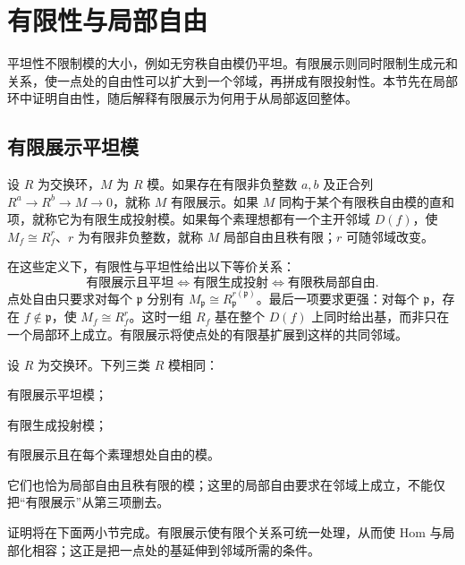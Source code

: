 
\section{有限性与局部自由}\label{b3:sec:1202}

平坦性不限制模的大小，例如无穷秩自由模仍平坦。有限展示则同时限制生成元和关系，使一点处的自由性可以扩大到一个邻域，再拼成有限投射性。本节先在局部环中证明自由性，随后解释有限展示为何用于从局部返回整体。

\subsection{有限展示平坦模}\label{b3:subsec:1202:01}

设 \(R\) 为交换环，\(M\) 为 \(R\) 模。如果存在有限非负整数 \(a,b\) 及正合列 \(R^a\to R^b\to M\to0\)，就称 \(M\) 有限展示。如果 \(M\) 同构于某个有限秩自由模的直和项，就称它为有限生成投射模。如果每个素理想都有一个主开邻域 \(D(f)\)，使 \(M_f\cong R_f^r\)、\(r\) 为有限非负整数，就称 \(M\) 局部自由且秩有限；\(r\) 可随邻域改变。

在这些定义下，有限性与平坦性给出以下等价关系：
\[
	\boxed{\text{有限展示且平坦}} \Longleftrightarrow\boxed{\text{有限生成投射}} \Longleftrightarrow\boxed{\text{有限秩局部自由}}.
\]
点处自由只要求对每个 \(\mathfrak p\) 分别有 \(M_{\mathfrak p}\cong R_{\mathfrak p}^{r(\mathfrak p)}\)。最后一项要求更强：对每个 \(\mathfrak p\)，存在 \(f\notin\mathfrak p\)，使 \(M_f\cong R_f^r\)。这时一组 \(R_f\) 基在整个 \(D(f)\) 上同时给出基，而非只在一个局部环上成立。有限展示将使点处的有限基扩展到这样的共同邻域。

\begin{theorem}\label{b3:thm:finite-presentation-flat-projective}
	设 \(R\) 为交换环。下列三类 \(R\) 模相同：
	\begin{equivalences}
		\item 有限展示平坦模；
		\item 有限生成投射模；
		\item 有限展示且在每个素理想处自由的模。
	\end{equivalences}
	它们也恰为局部自由且秩有限的模；这里的局部自由要求在邻域上成立，不能仅把“有限展示”从第三项删去。
\end{theorem}

证明将在下面两小节完成。有限展示使有限个关系可统一处理，从而使 Hom 与局部化相容；这正是把一点处的基延伸到邻域所需的条件。

